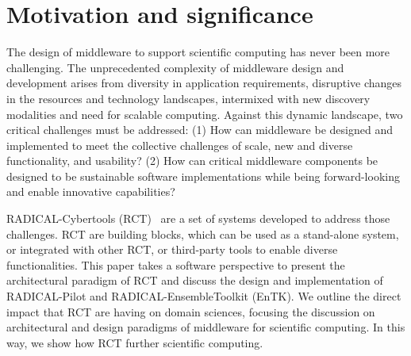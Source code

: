 \documentclass[preprint,12pt, a4paper]{elsarticle}
\begin{document}
\section{Motivation and significance}\label{sec:motivation}


The design of middleware to support scientific computing has never been more
challenging. The unprecedented complexity of middleware design and development
arises from diversity in application requirements, disruptive changes in the
resources and technology landscapes, intermixed with new discovery modalities
and need for scalable computing. Against this dynamic landscape, two critical
challenges must be addressed: (1) How can middleware be designed and implemented
to meet the collective challenges of scale, new and diverse functionality, and
usability? (2) How can critical middleware components be designed to be
sustainable software implementations while being forward-looking and enable
innovative capabilities?

RADICAL-Cybertools (RCT)~\cite{github-rct} are a set of systems developed to
address those challenges.  RCT are building blocks, which can be used as a
stand-alone system, or integrated with other RCT, or third-party tools to enable
diverse functionalities.
This paper takes a software perspective to present the architectural paradigm of
RCT and discuss the design and implementation of
RADICAL-Pilot and RADICAL-EnsembleToolkit (EnTK). We outline the direct impact
that RCT are having on domain sciences, focusing the discussion on architectural
and design paradigms of middleware for scientific computing. In this way, we
show how RCT further
scientific computing.
\end{document}
